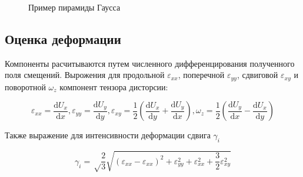 \begin{figure}[ht]
\caption{Пример пирамиды Гаусса}
\label{pic:pyramid}
\end{figure}

\subsection{Оценка деформации}
Компоненты расчитываются путем численного дифференцирования полученного поля смещений. Вырожения для продольной $\varepsilon_{xx}$, поперечной $\varepsilon_{yy}$, сдвиговой $\varepsilon_{xy}$ и поворотной $\omega_z$ компонент тензора дисторсии:

$$\varepsilon_{xx}= \frac{\mathrm{d} U_x}{\mathrm{d} x},\varepsilon_{yy}= \frac{\mathrm{d} U_y}{\mathrm{d} y},\varepsilon_{xy}=\frac{1}{2}(\frac{\mathrm{d} U_x}{\mathrm{d} y} + \frac{\mathrm{d} U_y}{\mathrm{d} x}),\omega_z=\frac{1}{2}(\frac{\mathrm{d} U_y}{\mathrm{d} x} - \frac{\mathrm{d} U_x}{\mathrm{d} y})$$

Также выражение для интенсивности деформации сдвига $\gamma_i$

$$\gamma_i = \sqrt\frac{2}{3}\sqrt{(\varepsilon_{xx}-\varepsilon_{xx})^2+\varepsilon_{yy}^2+\varepsilon_{xx}^2 + \frac{3}{2}\varepsilon_{xy}^2}$$

